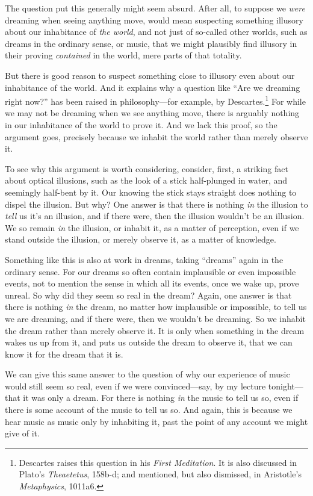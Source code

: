 \documentclass[12pt]{memoir}
\begin{document}
The question put this generally might seem absurd. After all, to suppose
we \emph{were} dreaming when seeing anything move, would mean suspecting
something illusory about our inhabitance of \emph{the world}, and not
just of so-called other worlds, such as dreams in the ordinary sense, or
music, that we might plausibly find illusory in their proving
\emph{contained} in the world, mere parts of that totality.

But there is good reason to suspect something close to illusory even
about our inhabitance of the world. And it explains why a question like
``Are we dreaming right now?'' has been raised in philosophy---for
example, by Descartes.\footnote{Descartes raises this question in his
  \emph{First Meditation}. It is also discussed in Plato's
  \emph{Theaetetus}, 158b-d; and mentioned, but also dismissed, in
  Aristotle's \emph{Metaphysics}, 1011a6.} For while we may not be
dreaming when we see anything move, there is arguably nothing in our
inhabitance of the world to prove it. And we lack this proof, so the
argument goes, precisely because we inhabit the world rather than merely
observe it.

To see why this argument is worth considering, consider, first, a
striking fact about optical illusions, such as the look of a stick
half-plunged in water, and seemingly half-bent by it. Our knowing the
stick stays straight does nothing to dispel the illusion. But why? One
answer is that there is nothing \emph{in} the illusion to \emph{tell} us
it's an illusion, and if there were, then the illusion wouldn't be an
illusion. We so remain \emph{in} the illusion, or inhabit it, as a
matter of perception, even if we stand outside the illusion, or merely
observe it, as a matter of knowledge.

Something like this is also at work in dreams, taking ``dreams'' again
in the ordinary sense. For our dreams so often contain implausible or
even impossible events, not to mention the sense in which all its
events, once we wake up, prove unreal. So why did they seem so real in
the dream? Again, one answer is that there is nothing \emph{in} the
dream, no matter how implausible or impossible, to tell us we are
dreaming, and if there were, then we wouldn't be dreaming. So we inhabit
the dream rather than merely observe it. It is only when something in
the dream wakes us up from it, and puts us outside the dream to observe
it, that we can know it for the dream that it is.

We can give this same answer to the question of why our experience of
music would still seem so real, even if we were convinced---say, by my
lecture tonight---that it was only a dream. For there is nothing
\emph{in} the music to tell us so, even if there is some account of the
music to tell us so. And again, this is because we hear music as music
only by inhabiting it, past the point of any account we might give of
it.
\end{document}

